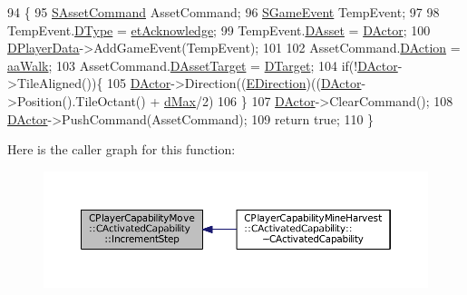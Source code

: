 \begin{DoxyCode}
94                                                              \{
95     \hyperlink{structSAssetCommand}{SAssetCommand} AssetCommand;
96     \hyperlink{structSGameEvent}{SGameEvent} TempEvent;
97     
98     TempEvent.\hyperlink{structSGameEvent_afa10562e243f4ac2b473b655cc58fee7}{DType} = \hyperlink{GameModel_8h_abfcf510bafec7c6429906a6ecaac656da9b68fc38f3ca4002cd7a3ec3cc07a612}{etAcknowledge};
99     TempEvent.\hyperlink{structSGameEvent_a40c85eeac83b96887b7449c9bdc5d624}{DAsset} = \hyperlink{classCActivatedPlayerCapability_a54ca944b47bff2718330639941d402b0}{DActor};
100     \hyperlink{classCActivatedPlayerCapability_a9bf27c322a73f4b11c8183cc1973c3d8}{DPlayerData}->AddGameEvent(TempEvent);
101         
102     AssetCommand.\hyperlink{structSAssetCommand_a8edd3b3d59a76d5514ba403bc8076a75}{DAction} = \hyperlink{GameDataTypes_8h_ab47668e651a3032cfb9c40ea2d60d670a60ca9010aa62b73c1aab838ff4bf7276}{aaWalk};
103     AssetCommand.\hyperlink{structSAssetCommand_a3d9b43f6e59c386c48c41a65448a0c39}{DAssetTarget} = \hyperlink{classCActivatedPlayerCapability_a8a1cf50b6501bcfd55af0c935828e395}{DTarget};
104     \textcolor{keywordflow}{if}(!\hyperlink{classCActivatedPlayerCapability_a54ca944b47bff2718330639941d402b0}{DActor}->TileAligned())\{
105         \hyperlink{classCActivatedPlayerCapability_a54ca944b47bff2718330639941d402b0}{DActor}->Direction((\hyperlink{GameDataTypes_8h_acb2b033915f6659a71a38b5aa6e4eb42}{EDirection})((\hyperlink{classCActivatedPlayerCapability_a54ca944b47bff2718330639941d402b0}{DActor}->Position().TileOctant() + 
      \hyperlink{GameDataTypes_8h_acb2b033915f6659a71a38b5aa6e4eb42af6546049275557ce0ade2ceee042a319}{dMax}/2) %
106     \}
107     \hyperlink{classCActivatedPlayerCapability_a54ca944b47bff2718330639941d402b0}{DActor}->ClearCommand();
108     \hyperlink{classCActivatedPlayerCapability_a54ca944b47bff2718330639941d402b0}{DActor}->PushCommand(AssetCommand);
109     \textcolor{keywordflow}{return} \textcolor{keyword}{true};
110 \}
\end{DoxyCode}
Here is the caller graph for this function\+:
\nopagebreak
\begin{figure}[H]
\begin{center}
\leavevmode
\includegraphics[width=350pt]{classCPlayerCapabilityMove_1_1CActivatedCapability_af4670890b462f59d24195db14aeb436d_icgraph}
\end{center}
\end{figure}
